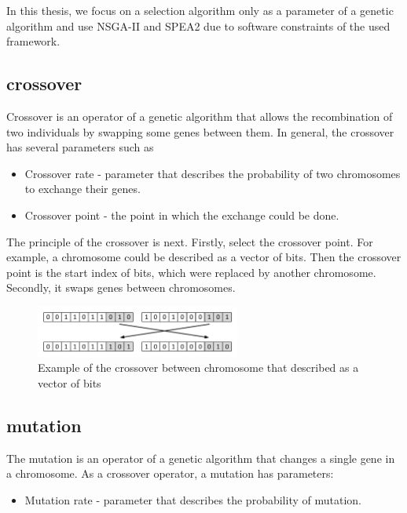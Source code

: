 In this thesis, we focus on a selection algorithm only as a parameter of a genetic algorithm and use NSGA-II and SPEA2 due to software constraints of the used framework. 

\subsection{crossover}\label{sec:GeneticAlgorithmCrossover}

Crossover is an operator of a genetic algorithm that allows the recombination of two individuals by swapping some genes between them.
In general, the crossover has several parameters such as

\begin{itemize}
	\item Crossover rate - parameter that describes the probability of two chromosomes to exchange their genes.
	\item Crossover point - the point in which the exchange could be done.
\end{itemize}

The principle of the crossover is next.
Firstly, select the crossover point. For example, a chromosome could be described as a vector of bits. Then the crossover point is the start index of bits, which were replaced by another chromosome.
Secondly, it swaps genes between chromosomes.

\begin{figure}
	\centering
	\includegraphics[width=0.6\textwidth]{images/crossoverVector.pdf}
	\caption[Example of the crossover]{Example of the crossover between chromosome that described as a vector of bits}
	\label{fig:crossoverVector}
\end{figure}

\subsection{mutation}\label{sec:GeneticAlgorithmMutation}

The mutation is an operator of a genetic algorithm that changes a single gene in a chromosome. As a crossover operator, a mutation has parameters:

\begin{itemize}
	\item Mutation rate - parameter that describes the probability of mutation.
\end{itemize}

